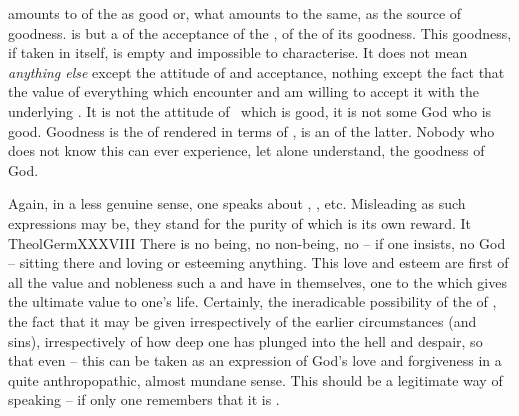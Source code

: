 \label{adthankfulness}  amounts to
 of the  as good or, what amounts to the same,
as the source of goodness.   is but a  of
the acceptance of the , of the  of its goodness.
This goodness, if taken in itself, is empty and impossible to characterise.
It does not mean {\em anything else} except the attitude of 
and acceptance, nothing except the fact that   the
value of everything which  encounter and am willing to accept it with the
underlying .  It is not the attitude of \yes\ which is good, it is
not some God who is good. Goodness is the  of
 rendered in terms of , is an  of
the latter.  Nobody who does not know this  can ever
experience, let alone understand, the goodness of God.

Again, in a less genuine sense, one speaks about , , etc.  Misleading as such expressions may be, they stand for the
purity of  which is its own reward.  It \citet{is not chosen in
  order to serve any end, or to get anything by it, but for the love of its
  nobleness, and because God loveth and esteemeth it so
  greatly.}{TheolGerm}{XXXVIII} There is no being, no non-being, no
 -- if one insists, no God -- sitting there and loving or esteeming
anything.  This love and esteem are first of all the value and {nobleness} such
a  and  have in themselves,  one to the
 which gives the ultimate value to one's life. Certainly,
the ineradicable possibility of the  of , the fact that it
may be given irrespectively of the earlier circumstances (and sins),
irrespectively of how deep one has plunged into the hell and despair, so that
even  -- this can be taken as an expression of {God's
  love} and forgiveness in a quite anthropopathic, almost mundane sense.  This
should be a legitimate way of speaking -- if only one remembers that it is
.  


